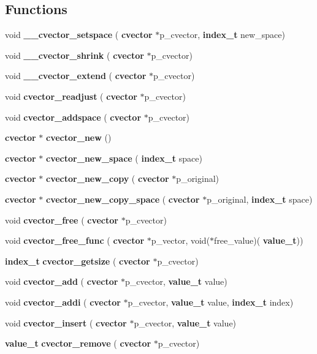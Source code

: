 \subsection*{Functions}
\begin{DoxyCompactItemize}
\item 
void \textbf{ \+\_\+\+\_\+cvector\+\_\+setspace} (\textbf{ cvector} $\ast$p\+\_\+cvector, \textbf{ index\+\_\+t} new\+\_\+space)
\item 
void \textbf{ \+\_\+\+\_\+cvector\+\_\+shrink} (\textbf{ cvector} $\ast$p\+\_\+cvector)
\item 
void \textbf{ \+\_\+\+\_\+cvector\+\_\+extend} (\textbf{ cvector} $\ast$p\+\_\+cvector)
\item 
void \textbf{ cvector\+\_\+readjust} (\textbf{ cvector} $\ast$p\+\_\+cvector)
\item 
void \textbf{ cvector\+\_\+addspace} (\textbf{ cvector} $\ast$p\+\_\+cvector)
\item 
\textbf{ cvector} $\ast$ \textbf{ cvector\+\_\+new} ()
\item 
\textbf{ cvector} $\ast$ \textbf{ cvector\+\_\+new\+\_\+space} (\textbf{ index\+\_\+t} space)
\item 
\textbf{ cvector} $\ast$ \textbf{ cvector\+\_\+new\+\_\+copy} (\textbf{ cvector} $\ast$p\+\_\+original)
\item 
\textbf{ cvector} $\ast$ \textbf{ cvector\+\_\+new\+\_\+copy\+\_\+space} (\textbf{ cvector} $\ast$p\+\_\+original, \textbf{ index\+\_\+t} space)
\item 
void \textbf{ cvector\+\_\+free} (\textbf{ cvector} $\ast$p\+\_\+cvector)
\item 
void \textbf{ cvector\+\_\+free\+\_\+func} (\textbf{ cvector} $\ast$p\+\_\+vector, void($\ast$free\+\_\+value)(\textbf{ value\+\_\+t}))
\item 
\textbf{ index\+\_\+t} \textbf{ cvector\+\_\+getsize} (\textbf{ cvector} $\ast$p\+\_\+cvector)
\item 
void \textbf{ cvector\+\_\+add} (\textbf{ cvector} $\ast$p\+\_\+cvector, \textbf{ value\+\_\+t} value)
\item 
void \textbf{ cvector\+\_\+addi} (\textbf{ cvector} $\ast$p\+\_\+cvector, \textbf{ value\+\_\+t} value, \textbf{ index\+\_\+t} index)
\item 
void \textbf{ cvector\+\_\+insert} (\textbf{ cvector} $\ast$p\+\_\+cvector, \textbf{ value\+\_\+t} value)
\item 
\textbf{ value\+\_\+t} \textbf{ cvector\+\_\+remove} (\textbf{ cvector} $\ast$p\+\_\+cvector)

\end{DoxyCompactItemize}
